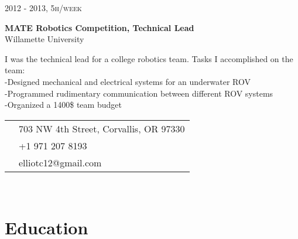 \documentclass[10pt]{article} %
\begin{document}
{\begin{minipage}[t]{0.5\textwidth}
{\raggedleft\textsc{2012 - 2013, 5h/week}\par}

{\raggedright\large \textbf{MATE Robotics Competition, Technical Lead}\\
{Willamette University}\\[5pt]}
\normalsize{I was the technical lead for a college robotics team. Tasks I accomplished on the team:}\\
\hspace*{0.2in}-Designed mechanical and electrical systems for an underwater ROV\\
\hspace*{0.2in}-Programmed rudimentary communication between different ROV systems\\
\hspace*{0.2in}-Organized a 1400\$ team budget\\




\end{minipage} %
\hfill
\begin{minipage}[t]{0.44\textwidth} %
\vspace{0pt} %


\colorbox{shade}{\textcolor{text1}{
\begin{tabular}{c|p{7cm}}
\raisebox{-4pt}{} & 703 NW 4th Street, Corvallis, OR 97330\\ %
\raisebox{-3pt}{\Mobilefone} & +1 971 207 8193\\ %
\raisebox{-1pt}{\Letter} & elliotc12@gmail.com \\ %
\end{tabular}
}
}\\[10pt]


\section{Education} 


\end{minipage}}
\end{document}
